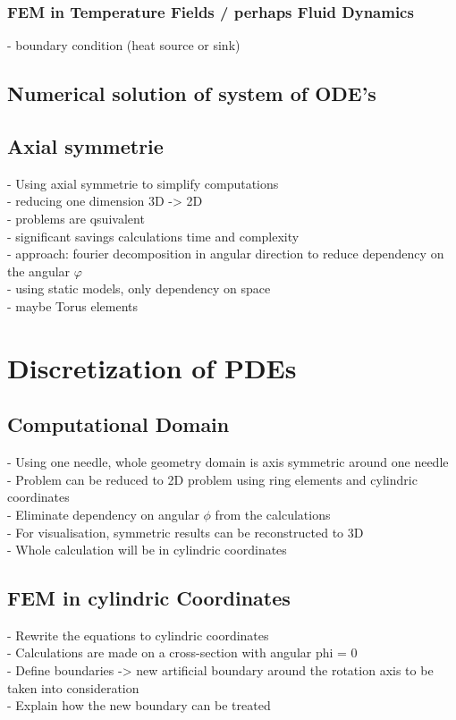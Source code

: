 \documentclass[parskip=half, titlepage=yes, 12pt, BCOR=12mm, DIV=calc]{scrartcl}
\begin{document}
\subsubsection{FEM in Temperature Fields / perhaps Fluid Dynamics}
- boundary condition (heat source or sink) \\

\subsection{Numerical solution of system of ODE's}

\subsection{Axial symmetrie}
- Using axial symmetrie to simplify computations \\
- reducing one dimension 3D -> 2D \\
- problems are qsuivalent \\
- significant savings calculations time and complexity \\
- approach: fourier decomposition in angular direction to reduce dependency on the angular $\varphi$ \\
- using static models, only dependency on space \\
- maybe Torus elements \\




\section{Discretization of PDEs}

\subsection{Computational Domain}
- Using one needle, whole geometry domain is axis symmetric around one needle \\
- Problem can be reduced to 2D problem using ring elements and cylindric coordinates \\
- Eliminate dependency on angular $\phi$ from the calculations \\
- For visualisation, symmetric results can be reconstructed to 3D \\
- Whole calculation will be in cylindric coordinates \\

\subsection{FEM in cylindric Coordinates}
- Rewrite the equations to cylindric coordinates \\
- Calculations are made on a cross-section with angular phi = 0 \\
- Define boundaries -> new artificial boundary around the rotation axis to be taken into consideration \\
- Explain how the new boundary can be treated \\
 
\end{document}
